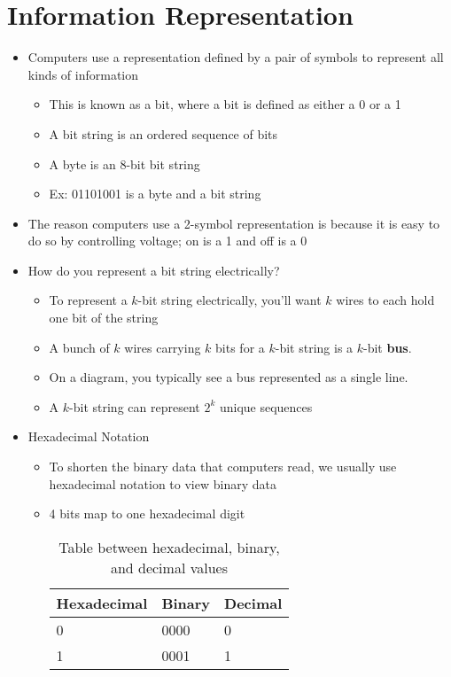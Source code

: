 \documentclass{article}
\begin{document}
\section{Information Representation}
\begin{itemize}
	\item Computers use a representation defined by a pair of symbols to represent all kinds of information
		\begin{itemize}
			\item This is known as a bit, where a bit is defined as either a 0 or a 1
			\item A bit string is an ordered sequence of bits
			\item A byte is an 8-bit bit string
			\item Ex: 01101001 is a byte and a bit string
		\end{itemize}
	\item The reason computers use a 2-symbol representation is because it is easy to do so by controlling voltage; on is a 1 and off is a 0
	\item How do you represent a bit string electrically?
		\begin{itemize}
			\item To represent a $k$-bit string electrically, you'll want $k$ wires to each hold one bit of the string
			\item A bunch of $k$ wires carrying $k$ bits for a $k$-bit string is a $k$-bit \textbf{bus}.
			\item On a diagram, you typically see a bus represented as a single line.
			\item A $k$-bit string can represent $2^k$ unique sequences
		\end{itemize}
	\item Hexadecimal Notation
		\begin{itemize}
			\item To shorten the binary data that computers read, we usually use hexadecimal notation to view binary data
			\item 4 bits map to one hexadecimal digit
				\begin{table}
					\caption{Table between hexadecimal, binary, and decimal values}
					\label{Amongus}
					\begin{center}
						\begin{tabular}[h]{l l l}
							Hexadecimal & Binary & Decimal \\
							\hline
							0 & 0000 & 0 \\
							1 & 0001 & 1 \\

\end{tabular}
\end{center}
\end{table}
\end{itemize}
\end{itemize}
\end{document}
